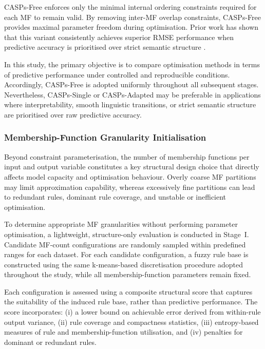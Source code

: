 \documentclass[a4paper,12pt,oneside]{article}
\begin{document}
CASPs-Free enforces only the minimal internal ordering constraints required for
each MF to remain valid.
By removing inter-MF overlap constraints, CASPs-Free provides maximal parameter
freedom during optimisation.
Prior work has shown that this variant consistently achieves superior RMSE
performance when predictive accuracy is prioritised over strict semantic
structure \cite{chen2025casp}.

In this study, the primary objective is to compare optimisation methods in terms
of predictive performance under controlled and reproducible conditions.
Accordingly, CASPs-Free is adopted uniformly throughout all subsequent stages.
Nevertheless, CASPs-Single or CASPs-Adapted may be preferable in applications
where interpretability, smooth linguistic transitions, or strict semantic
structure are prioritised over raw predictive accuracy.

\subsubsection{Membership-Function Granularity Initialisation}

Beyond constraint parameterisation, the number of membership functions per input
and output variable constitutes a key structural design choice that directly
affects model capacity and optimisation behaviour.
Overly coarse MF partitions may limit approximation capability, whereas
excessively fine partitions can lead to redundant rules, dominant rule coverage,
and unstable or inefficient optimisation.

To determine appropriate MF granularities without performing parameter
optimisation, a lightweight, structure-only evaluation is conducted in
Stage~I.
Candidate MF-count configurations are randomly sampled within predefined ranges
for each dataset.
For each candidate configuration, a fuzzy rule base is constructed using the
same k-means-based discretisation procedure adopted throughout the study, while
all membership-function parameters remain fixed.

Each configuration is assessed using a composite structural score that captures
the suitability of the induced rule base, rather than predictive performance.
The score incorporates:
(i) a lower bound on achievable error derived from within-rule output variance,
(ii) rule coverage and compactness statistics,
(iii) entropy-based measures of rule and membership-function utilisation, and
(iv) penalties for dominant or redundant rules.
\end{document}
